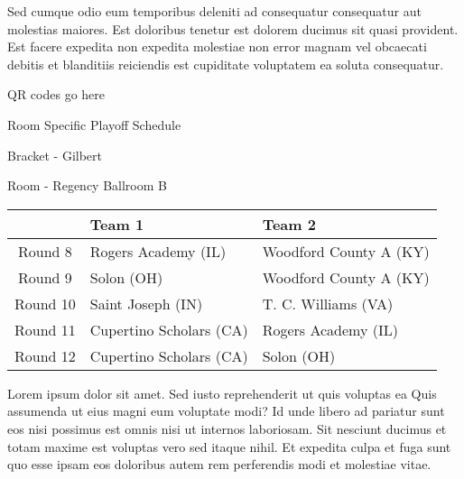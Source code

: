 \documentclass{article}%
\begin{document}
\newline%
Sed cumque odio eum temporibus deleniti ad consequatur consequatur aut molestias maiores. Est doloribus tenetur est dolorem ducimus sit quasi provident. Est facere expedita non expedita molestiae non error magnam vel obcaecati debitis et blanditiis reiciendis est cupiditate voluptatem ea soluta consequatur.%
\vspace*{140pt}%
\begin{center}%
\begin{Huge}%
QR codes go here%
\end{Huge}%
\end{center}%
\newpage%
\begin{center}%
\begin{Huge}%
Room Specific Playoff Schedule%
\end{Huge}%
\vspace*{8pt}%
\linebreak%
\begin{Large}%
Bracket {-} Gilbert%
\end{Large}%
\vspace*{8pt}%
\linebreak%
\vspace*{8pt}%
\begin{Large}%
Room {-} Regency Ballroom B%
\end{Large}%
\end{center}%
%
\begin{tabularx}{\textwidth}{|c|Y|Y|}%
\hline%
&Team 1&Team 2\\%
\hline%
Round 8&Rogers Academy (IL)&Woodford County A (KY)\\%
Round 9&Solon (OH)&Woodford County A (KY)\\%
Round 10&Saint Joseph (IN)&T. C. Williams (VA)\\%
Round 11&Cupertino Scholars (CA)&Rogers Academy (IL)\\%
Round 12&Cupertino Scholars (CA)&Solon (OH)\\%
\hline%
\end{tabularx}%
\vspace*{8pt}%
\newline%
Lorem ipsum dolor sit amet. Sed iusto reprehenderit ut quis voluptas ea Quis assumenda ut eius magni eum voluptate modi? Id unde libero ad pariatur sunt eos nisi possimus est omnis nisi ut internos laboriosam. Sit nesciunt ducimus et totam maxime est voluptas vero sed itaque nihil. Et expedita culpa et fuga sunt quo esse ipsam eos doloribus autem rem perferendis modi et molestiae vitae.\newline%
\end{document}
